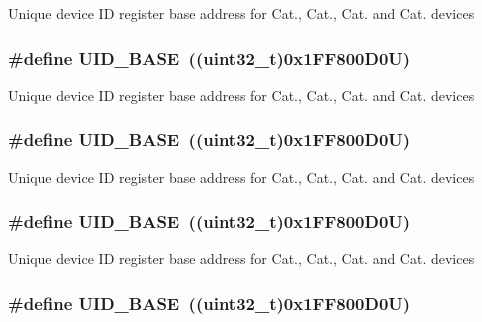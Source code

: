 Unique device I\-D register base address for Cat., Cat., Cat. and Cat. devices \hypertarget{group___peripheral__memory__map_ga664eda42b83c919b153b07b23348be67}{
\subsubsection[{U\-I\-D\-\_\-\-B\-A\-S\-E}]{\setlength{\rightskip}{0pt plus 5cm}\#define U\-I\-D\-\_\-\-B\-A\-S\-E~((uint32\-\_\-t)0x1\-F\-F800\-D0\-U)}}\label{group___peripheral__memory__map_ga664eda42b83c919b153b07b23348be67}
Unique device I\-D register base address for Cat., Cat., Cat. and Cat. devices \hypertarget{group___peripheral__memory__map_ga664eda42b83c919b153b07b23348be67}{
\subsubsection[{U\-I\-D\-\_\-\-B\-A\-S\-E}]{\setlength{\rightskip}{0pt plus 5cm}\#define U\-I\-D\-\_\-\-B\-A\-S\-E~((uint32\-\_\-t)0x1\-F\-F800\-D0\-U)}}\label{group___peripheral__memory__map_ga664eda42b83c919b153b07b23348be67}
Unique device I\-D register base address for Cat., Cat., Cat. and Cat. devices \hypertarget{group___peripheral__memory__map_ga664eda42b83c919b153b07b23348be67}{
\subsubsection[{U\-I\-D\-\_\-\-B\-A\-S\-E}]{\setlength{\rightskip}{0pt plus 5cm}\#define U\-I\-D\-\_\-\-B\-A\-S\-E~((uint32\-\_\-t)0x1\-F\-F800\-D0\-U)}}\label{group___peripheral__memory__map_ga664eda42b83c919b153b07b23348be67}
Unique device I\-D register base address for Cat., Cat., Cat. and Cat. devices \hypertarget{group___peripheral__memory__map_ga664eda42b83c919b153b07b23348be67}{
\subsubsection[{U\-I\-D\-\_\-\-B\-A\-S\-E}]{\setlength{\rightskip}{0pt plus 5cm}\#define U\-I\-D\-\_\-\-B\-A\-S\-E~((uint32\-\_\-t)0x1\-F\-F800\-D0\-U)}}\label{group___peripheral__memory__map_ga664eda42b83c919b153b07b23348be67}
